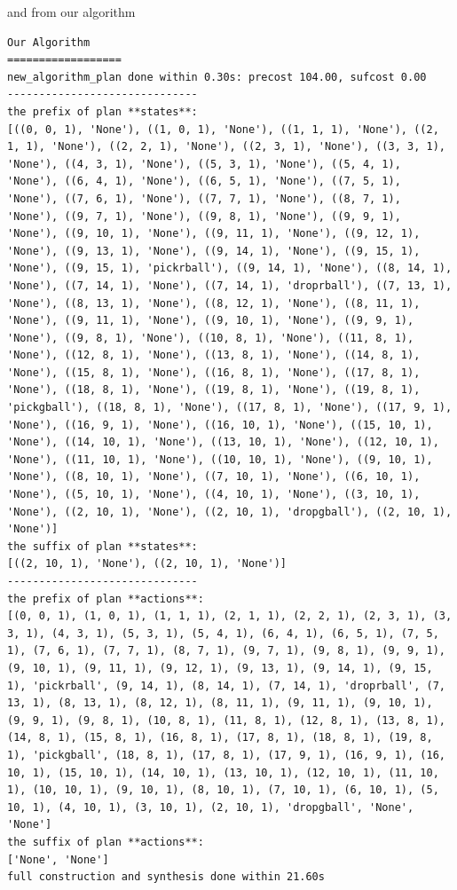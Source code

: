 and from our algorithm
\begin{lstlisting}
Our Algorithm
==================
new_algorithm_plan done within 0.30s: precost 104.00, sufcost 0.00
------------------------------
the prefix of plan **states**:
[((0, 0, 1), 'None'), ((1, 0, 1), 'None'), ((1, 1, 1), 'None'), ((2, 1, 1), 'None'), ((2, 2, 1), 'None'), ((2, 3, 1), 'None'), ((3, 3, 1), 'None'), ((4, 3, 1), 'None'), ((5, 3, 1), 'None'), ((5, 4, 1), 'None'), ((6, 4, 1), 'None'), ((6, 5, 1), 'None'), ((7, 5, 1), 'None'), ((7, 6, 1), 'None'), ((7, 7, 1), 'None'), ((8, 7, 1), 'None'), ((9, 7, 1), 'None'), ((9, 8, 1), 'None'), ((9, 9, 1), 'None'), ((9, 10, 1), 'None'), ((9, 11, 1), 'None'), ((9, 12, 1), 'None'), ((9, 13, 1), 'None'), ((9, 14, 1), 'None'), ((9, 15, 1), 'None'), ((9, 15, 1), 'pickrball'), ((9, 14, 1), 'None'), ((8, 14, 1), 'None'), ((7, 14, 1), 'None'), ((7, 14, 1), 'droprball'), ((7, 13, 1), 'None'), ((8, 13, 1), 'None'), ((8, 12, 1), 'None'), ((8, 11, 1), 'None'), ((9, 11, 1), 'None'), ((9, 10, 1), 'None'), ((9, 9, 1), 'None'), ((9, 8, 1), 'None'), ((10, 8, 1), 'None'), ((11, 8, 1), 'None'), ((12, 8, 1), 'None'), ((13, 8, 1), 'None'), ((14, 8, 1), 'None'), ((15, 8, 1), 'None'), ((16, 8, 1), 'None'), ((17, 8, 1), 'None'), ((18, 8, 1), 'None'), ((19, 8, 1), 'None'), ((19, 8, 1), 'pickgball'), ((18, 8, 1), 'None'), ((17, 8, 1), 'None'), ((17, 9, 1), 'None'), ((16, 9, 1), 'None'), ((16, 10, 1), 'None'), ((15, 10, 1), 'None'), ((14, 10, 1), 'None'), ((13, 10, 1), 'None'), ((12, 10, 1), 'None'), ((11, 10, 1), 'None'), ((10, 10, 1), 'None'), ((9, 10, 1), 'None'), ((8, 10, 1), 'None'), ((7, 10, 1), 'None'), ((6, 10, 1), 'None'), ((5, 10, 1), 'None'), ((4, 10, 1), 'None'), ((3, 10, 1), 'None'), ((2, 10, 1), 'None'), ((2, 10, 1), 'dropgball'), ((2, 10, 1), 'None')]
the suffix of plan **states**:
[((2, 10, 1), 'None'), ((2, 10, 1), 'None')]
------------------------------
the prefix of plan **actions**:
[(0, 0, 1), (1, 0, 1), (1, 1, 1), (2, 1, 1), (2, 2, 1), (2, 3, 1), (3, 3, 1), (4, 3, 1), (5, 3, 1), (5, 4, 1), (6, 4, 1), (6, 5, 1), (7, 5, 1), (7, 6, 1), (7, 7, 1), (8, 7, 1), (9, 7, 1), (9, 8, 1), (9, 9, 1), (9, 10, 1), (9, 11, 1), (9, 12, 1), (9, 13, 1), (9, 14, 1), (9, 15, 1), 'pickrball', (9, 14, 1), (8, 14, 1), (7, 14, 1), 'droprball', (7, 13, 1), (8, 13, 1), (8, 12, 1), (8, 11, 1), (9, 11, 1), (9, 10, 1), (9, 9, 1), (9, 8, 1), (10, 8, 1), (11, 8, 1), (12, 8, 1), (13, 8, 1), (14, 8, 1), (15, 8, 1), (16, 8, 1), (17, 8, 1), (18, 8, 1), (19, 8, 1), 'pickgball', (18, 8, 1), (17, 8, 1), (17, 9, 1), (16, 9, 1), (16, 10, 1), (15, 10, 1), (14, 10, 1), (13, 10, 1), (12, 10, 1), (11, 10, 1), (10, 10, 1), (9, 10, 1), (8, 10, 1), (7, 10, 1), (6, 10, 1), (5, 10, 1), (4, 10, 1), (3, 10, 1), (2, 10, 1), 'dropgball', 'None', 'None']
the suffix of plan **actions**:
['None', 'None']
full construction and synthesis done within 21.60s
\end{lstlisting} 

